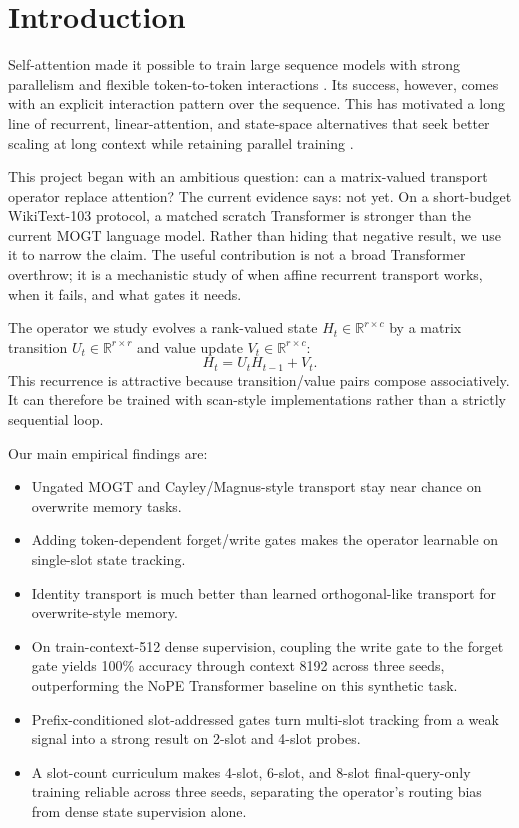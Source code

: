 \documentclass[10pt]{article}
\newcommand{\mogt}{MOGT}
\newcommand{\R}{\mathbb{R}}
\begin{document}
\section{Introduction}

Self-attention made it possible to train large sequence models with strong
parallelism and flexible token-to-token interactions \cite{vaswani2017attention}.
Its success, however, comes with an explicit interaction pattern over the
sequence. This has motivated a long line of recurrent, linear-attention, and
state-space alternatives that seek better scaling at long context while
retaining parallel training \cite{katharopoulos2020transformers,gu2021s4,
sun2023retnet,peng2023rwkv,gu2023mamba,koo2023gateloop}.

This project began with an ambitious question: can a matrix-valued transport
operator replace attention? The current evidence says: not yet. On a
short-budget WikiText-103 protocol, a matched scratch Transformer is stronger
than the current \mogt{} language model. Rather than hiding that negative
result, we use it to narrow the claim. The useful contribution is not a broad
Transformer overthrow; it is a mechanistic study of when affine recurrent
transport works, when it fails, and what gates it needs.

The operator we study evolves a rank-valued state $H_t \in \R^{r \times c}$ by
a matrix transition $U_t \in \R^{r \times r}$ and value update
$V_t \in \R^{r \times c}$:
\begin{equation}
    H_t = U_t H_{t-1} + V_t.
    \label{eq:affine}
\end{equation}
This recurrence is attractive because transition/value pairs compose
associatively. It can therefore be trained with scan-style implementations
rather than a strictly sequential loop.

Our main empirical findings are:
\begin{itemize}
    \item Ungated \mogt{} and Cayley/Magnus-style transport stay near chance on
    overwrite memory tasks.
    \item Adding token-dependent forget/write gates makes the operator
    learnable on single-slot state tracking.
    \item Identity transport is much better than learned orthogonal-like
    transport for overwrite-style memory.
    \item On train-context-512 dense supervision, coupling the write gate to the
    forget gate yields 100\% accuracy through context 8192 across three seeds,
    outperforming the NoPE Transformer baseline on this synthetic task.
    \item Prefix-conditioned slot-addressed gates turn multi-slot tracking from
    a weak signal into a strong result on 2-slot and 4-slot probes.
    \item A slot-count curriculum makes 4-slot, 6-slot, and 8-slot final-query-only training
    reliable across three seeds, separating the operator's routing bias from
    dense state supervision alone.
\end{itemize}
\end{document}
